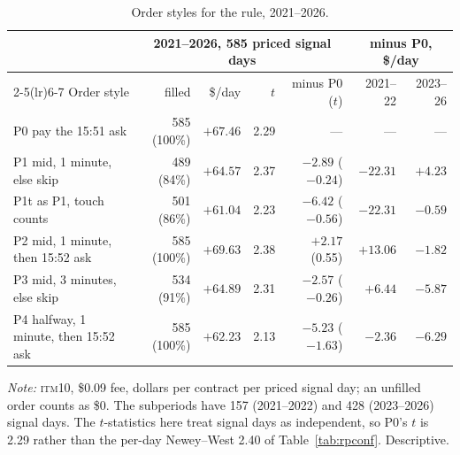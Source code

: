 \documentclass[12pt,letterpaper]{article}
\newcommand{\tabnotes}[1]{\par\vspace{5pt}\parbox{\linewidth}{\footnotesize\setlength{\parindent}{0pt}\textit{Note:} #1}\par}
\newcommand{\ITM}[1]{\textsc{itm}#1}
\begin{document}
\begin{table}[htbp]
\centering
\caption{Order styles for the rule, 2021--2026.}
\label{tab:fills}
\setlength{\tabcolsep}{4pt}
\begin{tabular}{lrrrrrr}
\toprule
& \multicolumn{4}{c}{2021--2026, 585 priced signal days} & \multicolumn{2}{c}{minus P0, \$/day} \\
\cmidrule(lr){2-5}\cmidrule(lr){6-7}
Order style & filled & \$/day & $t$ & minus P0 ($t$) & 2021--22 & 2023--26 \\
\midrule
P0 pay the 15:51 ask & 585 (100\%) & $+67.46$ & 2.29 & --- & --- & --- \\
P1 mid, 1 minute, else skip & 489 (84\%) & $+64.57$ & 2.37 & $-2.89$ ($-0.24$) & $-22.31$ & $+4.23$ \\
P1t as P1, touch counts & 501 (86\%) & $+61.04$ & 2.23 & $-6.42$ ($-0.56$) & $-22.31$ & $-0.59$ \\
P2 mid, 1 minute, then 15:52 ask & 585 (100\%) & $+69.63$ & 2.38 & $+2.17$ (0.55) & $+13.06$ & $-1.82$ \\
P3 mid, 3 minutes, else skip & 534 (91\%) & $+64.89$ & 2.31 & $-2.57$ ($-0.26$) & $+6.44$ & $-5.87$ \\
P4 halfway, 1 minute, then 15:52 ask & 585 (100\%) & $+62.23$ & 2.13 & $-5.23$ ($-1.63$) & $-2.36$ & $-6.29$ \\
\bottomrule
\end{tabular}
\tabnotes{\ITM{10}, \$0.09 fee, dollars per contract per priced signal day; an
unfilled order counts as \$0. The subperiods have 157 (2021--2022) and 428
(2023--2026) signal days. The $t$-statistics here treat signal days as
independent, so P0's $t$ is 2.29 rather than the per-day Newey--West 2.40 of
Table~\ref{tab:rpconf}. Descriptive.}
\end{table}
\end{document}

